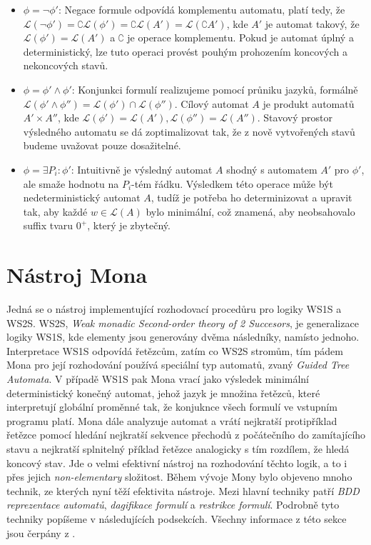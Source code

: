 \begin{itemize}
    \item $\phi = \neg \phi'$: Negace formule odpovídá komplementu automatu, platí tedy, že $ \mathcal{L}(\neg \phi') = \complement \mathcal{L}(\phi') = \complement \mathcal{L}(A') = \mathcal{L}(\complement A') $, kde $A'$ je automat takový, že $ \mathcal{L}(\phi') = \mathcal{L}(A') $ a $\complement$ je operace komplementu. Pokud je automat úplný a deterministický, lze tuto operaci provést pouhým prohozením koncových a nekoncových stavů.
    \item $\phi = \phi' \wedge \phi'$: Konjunkci formulí realizujeme pomocí průniku jazyků, formálně $ \mathcal{L}(\phi' \wedge \phi'') = \mathcal{L}(\phi') \cap \mathcal{L}(\phi'') $. Cílový automat $A$ je produkt automatů $ A' \times A'' $, kde $ \mathcal{L}(\phi') = \mathcal{L}(A'), \mathcal{L}(\phi'') = \mathcal{L}(A'') $. Stavový prostor výsledného automatu se dá zoptimalizovat tak, že z nově vytvořených stavů budeme uvažovat pouze dosažitelné.
    \item $\phi = \exists P_i: \phi'$: Intuitivně je výsledný automat $A$ shodný s automatem $A'$ pro $\phi'$, ale smaže hodnotu na $P_i$-tém řádku. Výsledkem této operace může být nedeterministický automat $A$, tudíž je potřeba ho determinizovat a upravit tak, aby každé $w \in \mathcal{L}(A)$ bylo minimální, což znamená, aby neobsahovalo suffix tvaru $0^+$, který je zbytečný.
\end{itemize}


\section{Nástroj Mona}

Jedná se o nástroj implementující rozhodovací procedůru pro logiky WS1S a WS2S. WS2S, \textit{Weak monadic Second-order theory of 2 Succesors}, je generalizace logiky WS1S, kde elementy jsou generovány dvěma následníky, namísto jednoho. Interpretace WS1S odpovídá řetězcům, zatím co WS2S stromům, tím pádem Mona pro její rozhodování používá speciální typ automatů, zvaný \textit{Guided Tree Automata}. V případě WS1S pak Mona vrací jako výsledek minimální deterministický konečný automat, jehož jazyk je množina řetězců, které interpretují globální proměnné tak, že konjuknce všech formulí ve vstupním programu platí.
Mona dále analyzuje automat a vrátí nejkratší protipříklad řetězce pomocí hledání nejkratší sekvence přechodů z počátečního do zamítajícího stavu a nejkratší splnitelný příklad řetězce analogicky s tím rozdílem, že hledá koncový stav. Jde o velmi efektivní nástroj na rozhodování těchto logik, a to i přes jejich \textit{non-elementary} složitost. Během vývoje Mony bylo objeveno mnoho technik, ze kterých nyní těží efektivita nástroje. Mezi hlavní techniky patří \textit{BDD reprezentace automatů}, \textit{dagifikace formulí} a \textit{restrikce formulí}. Podrobně tyto techniky popíšeme v následujících podsekcích. Všechny informace z této sekce jsou čerpány z \cite{mona_manual,mona_impl_sec,mona_new_tech,mona_restrictions,mona_log_aut_conn}.

